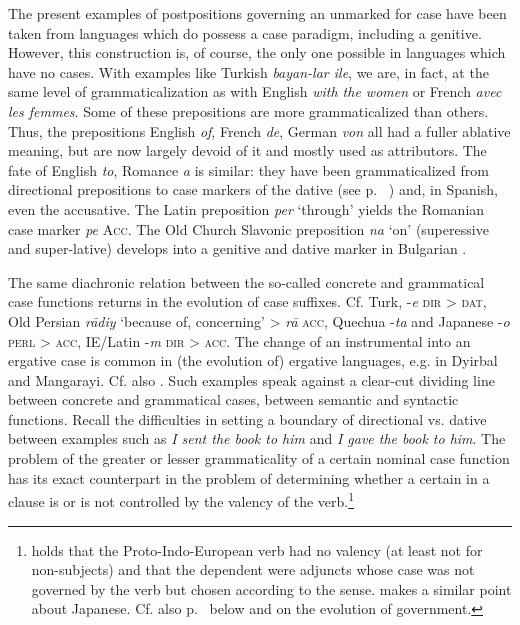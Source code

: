 \label{page88}The present examples of postpositions governing an \np unmarked for case have been taken from languages which do possess a case paradigm, including a genitive. However, this construction is, of course, the only one possible in languages which have no cases. With examples like Turkish \textit{bayan-lar ile}, we are, in fact, at the same level of grammaticalization as with English \textit{with the women} or French \textit{avec les femmes}. Some of these prepositions are more grammaticalized than others. Thus, the prepositions English \textit{of}, French \textit{de}, German \textit{von} all had a fuller ablative meaning, but are now largely devoid of it and mostly used as attributors. The fate of English \textit{to}, Romance \textit{a} is similar: they have been grammaticalized from directional prepositions to case markers of the dative (see p.~\pageref{page100}\chk%
)  and, in Spanish, even the accusative. The Latin preposition \textit{per} ‘through’ yields the Romanian case marker \textit{pe} \textsc{Acc}. The Old Church Slavonic preposition \textit{na} ‘on’ (superessive and super-lative) develops into a genitive and dative marker in Bulgarian \citep{Qvonje1979}.

The same diachronic relation between the so-called concrete and grammatical case functions returns in the evolution of case suffixes. Cf. Turk, -\textit{e} \textsc{dir} {\textgreater} \textsc{dat}, Old Persian \textit{r\=adiy} ‘because of, concerning’ {\textgreater} \textit{r\=a} \textsc{acc}, Quechua -\textit{ta} and Japanese -\textit{o} \textsc{perl} {\textgreater} \textsc{acc}, IE/Latin -\textit{m} \textsc{dir} {\textgreater} \textsc{acc}. The change of an instrumental into an ergative case is common in (the evolution of) ergative languages, e.g. in Dyirbal and Mangarayi. Cf. also . Such examples speak against a clear-cut dividing line between concrete and grammatical cases, between semantic and syntactic functions. Recall the difficulties in setting a boundary of directional vs. dative between examples such as \textit{I sent the book to him} and \textit{I gave the book to him}. The problem of the greater or lesser grammaticality of a certain nominal case function has its exact counterpart in the problem of determining whether a certain \np in a clause is or is not controlled by the valency of the verb.\footnote{\citet[357--359]{Meillet1934} holds that the Proto-Indo-European verb had no valency (at least not for non-subjects) and that the dependent \nps were adjuncts whose case was not governed by the verb but chosen according to the sense. \citet{Coseriu1979} makes a similar point about Japanese. Cf. also p.~\pageref{page101} below and \citet[§4.2]{Lehmann1983} on the evolution of government.}

